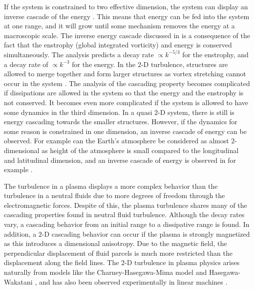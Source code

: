 If the system is constrained to two effective dimension, the system can display an inverse cascade of the energy \cite{Kraichan1980}.
This means that energy can be fed into the system at one range, and it will grow until some mechanism removes the energy at a macroscopic scale.
The inverse energy cascade discussed in \cite{Kraichan1980} is a consequence of the fact that the enstrophy (global integrated vorticity) and energy is conserved simultaneously.
The analysis predicts a decay rate $\propto k^{-5/3}$ for the enstrophy, and a decay rate of $\propto k^{-3}$ for the energy.
In the $2$-D turbulence, structures are allowed to merge together and form larger structures as vortex stretching cannot occur in the system \cite{Fjortoft1953}.
The analysis of the cascading property becomes complicated if dissipations are allowed in the system so that the energy and the enstrophy is not conserved.
It becomes even more complicated if the system is allowed to have some dynamics in the third dimension.
In a quasi $2$-D system, there is still is energy cascading towards the smaller structures.
However, if the dynamics for some reason is constrained in one dimension, an inverse cascade of energy can be observed.
For example can the Earth's atmosphere be considered as almost $2$-dimensional as height of the atmosphere is small compared to the longitudinal and latitudinal dimension, and an inverse cascade of energy is observed in for example \cite{Smith2002}.

The turbulence in a plasma displays a more complex behavior than the turbulence in a neutral fluids due to more degrees of freedom through the electromagnetic forces.
Despite of this, the plasma turbulence shares many of the cascading properties found in neutral fluid turbulence.
Although the decay rates vary, a cascading behavior from an initial range to a dissipative range is found.
In addition, a $2$-D cascading behavior can occur if the plasma is strongly magnetized as this introduces a dimensional anisotropy.
Due to the magnetic field, the perpendicular displacement of fluid parcels is much more restricted than the displacement along the field lines.
The $2$-D turbulence in plasma physics arises naturally from models like the Charney-Hasegawa-Mima model \cite{Boffetta2002} and Hasegawa-Wakatani \cite{Manz2009}, and has also been observed experimentally in linear machines \cite{Tynan2006a}.


